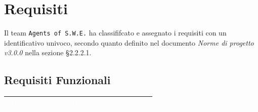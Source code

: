 \section{Requisiti}\label{Requisiti}

Il team \texttt{Agents of S.W.E.} ha classififcato e assegnato i requisiti con un identificativo univoco, secondo quanto definito nel documento \textit{Norme di progetto v3.0.0} nella sezione §2.2.2.1.

\subsection{Requisiti Funzionali}\label{RF}
\begin{center}
\begin{longtable}[c]{|m{}|m{}|m{}|m{}|}
\hline
\rowcolor{bluelogo}\textbf{\textcolor{white}{ID}} & \textbf{\textcolor{white}{Descrizione}} & \textbf{\textcolor{white}{Obbligatorietà}} & \textbf{\textcolor{white}{Fonti}}\\
\hline \hline
\endhead


\end{longtable}
\end{center}
